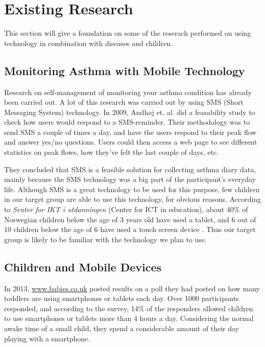 \section{Existing Research}
\label{sec:existing-research}

This section will give a foundation on some of the reserach performed on using technology in combination with diseases and children. 


\subsection{Monitoring Asthma with Mobile Technology}
Research on self-management of monitoring your asthma condition has already been carried out. A lot of this research was carried out by using SMS (Short Messaging System) technology. In 2009, Andh\o j  et. al.\cite{anhoj2004feasibility} did a feasability study to check how users would respond to a SMS-reminder. Their methodology was to send SMS a couple of times a day, and have the users respond to their peak flow and answer yes/no questions. Users could then access a web page to see different statistics on peak flows, how they've felt the last couple of days, etc.

They concluded that SMS is a feasible solution for collecting asthma diary data, mainly because the SMS technology was a big part of the participant's everyday life. Although SMS is a great technology to be used for this purpose, few children in our target group are able to use this technology, for obvious reasons. According to \emph{Senter for IKT i utdanningen} (Center for ICT in education), about 40\% of Norwegian children below the age of 3 years old have used a tablet, and 6 out of 10 children below the age of 6 have used a touch screen device \cite{nrkchilduse}. Thus our target group is likely to be familiar with the technology we plan to use.  


\subsection{Children and Mobile Devices}
In 2013, \url{www.babies.co.uk} posted results on a poll they had posted on how many toddlers are using smartphones or tablets each day\cite{babiesusageoftablets}. Over 1000 participants responded,  and according to the survey, 14\% of the responders allowed children to use smartphones or tablets more than 4 hours a day. Considering the normal awake time of a small child, they spend a considerable amount of their day playing with a smartphone.         


